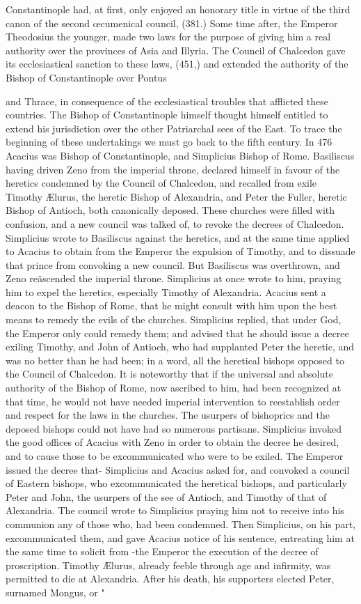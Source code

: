 Constantinople had, at first, only enjoyed an honorary title in virtue of the third canon of the second œcumenical council, (381.) Some time after, the Emperor Theodosius the younger, made two laws for the purpose of giving him a real authority over the provinces of Asia and Illyria. The Council of Chalcedon gave its ecclesiastical sanction to these laws, (451,) and extended the authority of the Bishop of Constantinople over Pontus

and Thrace, in consequence of the ecclesiastical troubles that afflicted these countries. The Bishop of Constantinople himself thought himself entitled to extend his jurisdiction over the other Patriarchal sees of the East. To trace the beginning of these undertakings we must go back to the fifth century. In 476 Acacius was Bishop of Constantinople, and Simplicius Bishop of Rome. Basiliscus having driven Zeno from the imperial throne, declared himself in favour of the heretics condemned by the Council of Chalcedon, and recalled from exile Timothy Ælurus, the heretic Bishop of Alexandria, and Peter the Fuller, heretic Bishop of Antioch, both canonically deposed. These churches were filled with confusion, and a new council was talked of, to revoke the decrees of Chalcedon. Simplicius wrote to Basiliscus against the heretics, and at the same time applied to Acacius to obtain from the Emperor the expulsion of Timothy, and to dissuade that prince from convoking a new council. But Basiliscus was overthrown, and Zeno reäscended the imperial throne. Simplicius at once wrote to him, praying him to expel the heretics, especially Timothy of Alexandria. Acacius sent a deacon to the Bishop of Rome, that he might consult with him upon the best means to remedy the evils of the churches. Simplicius replied, that under God, the Emperor only could remedy them; and advised that he should issue a decree exiling Timothy, and John of Antioch, who had supplanted Peter the heretic, and was no better than he had been; in a word, all the heretical bishops opposed to the Council of Chalcedon. It is noteworthy that if the universal and absolute authority of the Bishop of Rome, now ascribed to him, had been recognized at that time, he would not have needed imperial intervention to reestablish order and respect for the laws in the churches. The usurpers of bishoprics and the deposed bishops could not have had so numerous partisans. Simplicius invoked the good offices of Acacius with Zeno in order to obtain the decree he desired, and to cause those to be excommunicated who were to be exiled. The Emperor issued the decree that- Simplicius and Acacius asked for, and convoked a council of Eastern bishops, who excommunicated the heretical bishops, and particularly Peter and John, the usurpers of the see of Antioch, and Timothy of that of Alexandria. The council wrote to Simplicius praying him not to receive into his communion any of those who, had been condemned. Then Simplicius, on his part, excommunicated them, and gave Acacius notice of his sentence, entreating him at the same time to solicit from -the Emperor the execution of the decree of proscription. Timothy Ælurus, already feeble through age and infirmity, was permitted to die at Alexandria. After his death, his supporters elected Peter, surnamed Mongus, or " 